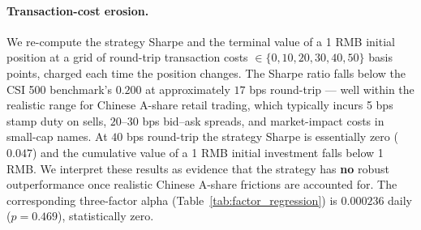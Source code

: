 \documentclass[AER]{AEA}
\begin{document}
\paragraph{Transaction-cost erosion.} We re-compute the strategy Sharpe and the terminal value of a 1 RMB initial position at a grid of round-trip transaction costs $\in \{0, 10, 20, 30, 40, 50\}$ basis points, charged each time the position changes. The Sharpe ratio falls below the CSI 500 benchmark's $0.200$ at approximately $17$ bps round-trip --- well within the realistic range for Chinese A-share retail trading, which typically incurs 5 bps stamp duty on sells, $20$--$30$ bps bid--ask spreads, and market-impact costs in small-cap names. At $40$ bps round-trip the strategy Sharpe is essentially zero ($0.047$) and the cumulative value of a 1 RMB initial investment falls below 1 RMB. We interpret these results as evidence that the strategy has \textbf{no} robust outperformance once realistic Chinese A-share frictions are accounted for. The corresponding three-factor alpha (Table~\ref{tab:factor_regression}) is $0.000236$ daily ($p=0.469$), statistically zero.
\end{document}
